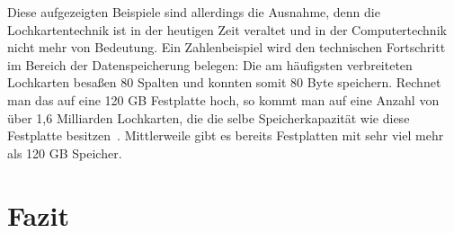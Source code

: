 \documentclass[parskip=half]{scrartcl}
\begin{document}
Diese aufgezeigten Beispiele sind allerdings die Ausnahme, denn die
Lochkartentechnik ist in der heutigen Zeit veraltet und in der Computertechnik
nicht mehr von Bedeutung. Ein Zahlenbeispiel wird den technischen Fortschritt
im Bereich der Datenspeicherung belegen: Die am häufigsten verbreiteten
Lochkarten besaßen 80 Spalten und konnten somit 80 Byte speichern. Rechnet man
das auf eine 120 GB Festplatte hoch, so kommt man auf eine Anzahl von über 1,6
Milliarden Lochkarten, die die selbe Speicherkapazität wie diese Festplatte
besitzen~\cite{roeltgen}. Mittlerweile gibt es bereits Festplatten mit sehr
viel mehr als 120 GB Speicher.

\section{Fazit}



\end{document}
